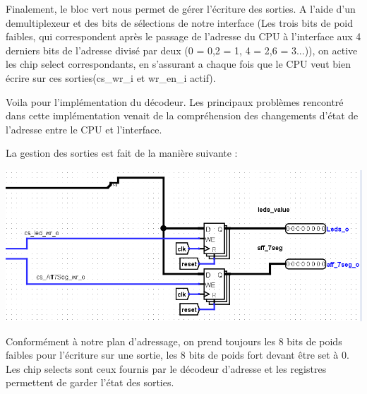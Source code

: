 Finalement, le bloc vert nous permet de gérer l'écriture des sorties. A l'aide d'un demultiplexeur et des bits de sélections de notre interface (Les trois bits de poid faibles, qui correspondent après le passage de l'adresse du CPU à l'interface aux 4 derniers bits de l'adresse divisé par deux (0 = 0,2 = 1, 4 = 2,6 = 3...)), on active les chip select correspondants, en s'assurant a chaque fois que le CPU veut bien écrire sur ces sorties(cs\_wr\_i et wr\_en\_i actif).\\\par

Voila pour l'implémentation du décodeur. Les principaux problèmes rencontré dans cette implémentation venait de la compréhension des changements d'état de l'adresse entre le CPU et l'interface.\\\par

La gestion des sorties est fait de la manière suivante : \\
\begin{center}
\includegraphics[scale=0.8]{./images/Sorties_partie1.png}\\\par
{}
\end{center}\par
Conformément à notre plan d'adressage, on prend toujours les 8 bits de poids faibles pour l'écriture sur une sortie, les 8 bits de poids fort devant être set à 0. Les chip selects sont ceux fournis par le décodeur d'adresse et les registres permettent de garder l'état des sorties.\\\par

